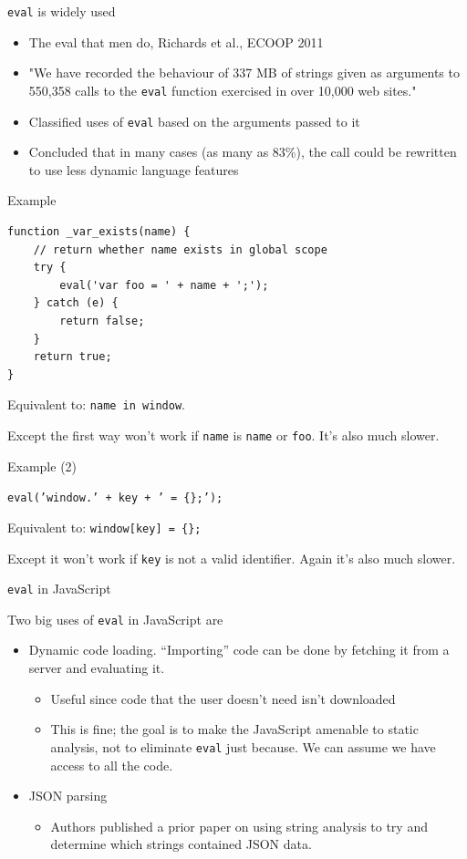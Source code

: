 \documentclass{beamer}
\begin{document}
\begin{frame}{{\tt eval} is widely used}
\begin{itemize}
\item The eval that men do, Richards et al., ECOOP 2011
\item "We have recorded the behaviour of 337 MB of strings given as
arguments to 550,358 calls to the {\tt eval} function exercised in over
10,000 web sites."
\item Classified uses of {\tt eval} based on the arguments passed to it
\item Concluded that in many cases (as many as 83\%), the call could be
rewritten to use less dynamic language features
\end{itemize}
\end{frame}

\begin{frame}[fragile]{Example}
\begin{verbatim}
function _var_exists(name) {
    // return whether name exists in global scope
    try {
        eval('var foo = ' + name + ';');
    } catch (e) {
        return false;
    }
    return true;
}
\end{verbatim}
\pause
\vspace{5mm}
Equivalent to: {\tt name in window}.

Except the first way won't work if {\tt name} is {\tt name} or {\tt foo}. 
It's also much slower.
\end{frame}

\begin{frame}{Example (2)}

{\tt eval('window.' + key + ' = \{\};'); }

\pause
\vspace{5mm}
Equivalent to: {\tt window[key] = \{\};}

Except it won't work if {\tt key} is not a valid identifier. Again it's
also much slower.

\end{frame}

\begin{frame}{{\tt eval} in JavaScript}

Two big uses of {\tt eval} in JavaScript are
\begin{itemize}
\item Dynamic code loading. ``Importing'' code can be done by
fetching it from a server and evaluating it.
\begin{itemize}
\item Useful since code that the user doesn't need isn't downloaded
\item This is fine; the goal is to make the JavaScript
amenable to static analysis, not to eliminate {\tt eval} just because. 
We can assume we have access to all the code.
\end{itemize}
\item JSON parsing
\begin{itemize}
\item Authors published a prior paper on using string analysis to try
and determine which strings contained JSON data.
\end{itemize}
\end{itemize}
\end{frame}
\end{document}
